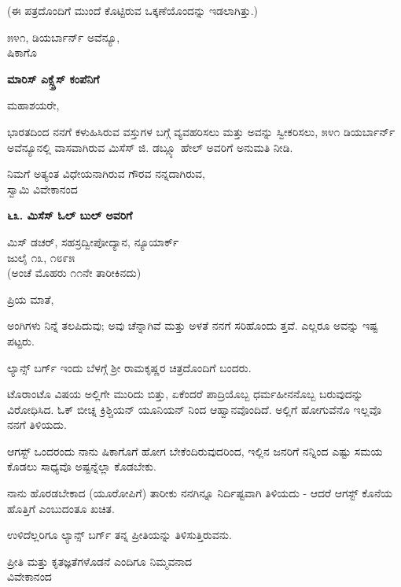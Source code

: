 (ಈ ಪತ್ರದೊಂದಿಗೆ ಮುಂದೆ ಕೊಟ್ಟಿರುವ ಒಕ್ಕಣೆಯೊಂದನ್ನು ಇಡಲಾಗಿತ್ತು.)

\begin{flushright}
೫೪೧, ಡಿಯರ್ಬಾರ್ನ್ ಅವೆನ್ಯೂ,\\ಷಿಕಾಗೊ
\end{flushright}

\begin{center}
\textbf{ಮಾರಿಸ್ ಎಕ್ಸ್ಪ್ರೆಸ್ ಕಂಪೆನಿಗೆ}
\end{center}

ಮಹಾಶಯರೇ,

ಭಾರತದಿಂದ ನನಗೆ ಕಳುಹಿಸಿರುವ ವಸ್ತುಗಳ ಬಗ್ಗೆ ವ್ಯವಹರಿಸಲು ಮತ್ತು ಅವನ್ನು ಸ್ವೀಕರಿಸಲು, ೫೪೧ ಡಿಯರ್ಬಾರ್ನ್ ಅವೆನ್ಯೂನಲ್ಲಿ ವಾಸವಾಗಿರುವ ಮಿಸೆಸ್ ಜಿ. ಡಬ್ಲ್ಯೂ ಹೇಲ್ ಅವರಿಗೆ ಅನುಮತಿ ನೀಡಿ.

\begin{flushright}
ನಿಮಗೆ ಅತ್ಯಂತ ವಿಧೇಯನಾಗಿರುವ ಗೌರವ ನನ್ನದಾಗಿರುವ,\\ಸ್ವಾಮಿ ವಿವೇಕಾನಂದ
\end{flushright}

\begin{center}
\textbf{೬೩. ಮಿಸೆಸ್ ಓಲ್ ಬುಲ್ ಅವರಿಗೆ}
\end{center}

\begin{flushright}
 ಮಿಸ್ ಡಚರ್, ಸಹಸ್ರದ್ವೀಪೋದ್ಯಾನ, ನ್ಯೂಯಾರ್ಕ್\\ಜುಲೈ ೧೩, ೧೮೯೫\\(ಅಂಚೆ ಮೊಹರು ೧೧ನೇ ತಾರೀಕಿನದು)
\end{flushright}

ಪ್ರಿಯ ಮಾತೆ,

ಅಂಗಿಗಳು ನಿನ್ನೆ ತಲಪಿದುವು; ಅವು ಚೆನ್ನಾಗಿವೆ ಮತ್ತು ಅಳತೆ ನನಗೆ ಸರಿಹೊಂದು ತ್ತವೆ. ಎಲ್ಲರೂ ಅವನ್ನು ಇಷ್ಟ ಪಟ್ಟರು.

ಲ್ಯಾನ್ಸ್ ಬರ್ಗ್ ಇಂದು ಬೆಳಗ್ಗೆ ಶ‍್ರೀ ರಾಮಕೃಷ್ಣರ ಚಿತ್ರದೊಂದಿಗೆ ಬಂದರು.

ಟೊರಾಂಟೊ ವಿಷಯ ಅಲ್ಲಿಗೇ ಮುರಿದು ಬಿತ್ತು, ಏಕೆಂದರೆ ಪಾದ್ರಿಯೊಬ್ಬ ಧರ್ಮಹೀನನೊಬ್ಬ ಬರುವುದನ್ನು ವಿರೋಧಿಸಿದ. ಓಕ್ ಬೀಚ್ನ ಕ್ರಿಶ್ಚಿಯನ್ ಯೂನಿಯನ್ ನಿಂದ ಆಹ್ವಾನವೊಂದಿದೆ. ಅಲ್ಲಿಗೆ ಹೋಗುವೆನೊ ಇಲ್ಲವೊ ನನಗೆ ತಿಳಿಯದು.

ಆಗಸ್ಟ್ ಒಂದರಂದು ನಾನು ಷಿಕಾಗೊಗೆ ಹೋಗ ಬೇಕೆಂದಿರುವುದರಿಂದ, ಇಲ್ಲಿನ ಜನರಿಗೆ ನನ್ನಿಂದ ಎಷ್ಟು ಸಮಯ ಕೊಡಲು ಸಾಧ್ಯವೊ ಅಷ್ಟನ್ನೆಲ್ಲಾ ಕೊಡಬೇಕು.

ನಾನು ಹೊರಡಬೇಕಾದ (ಯೂರೋಪಿಗೆ) ತಾರೀಕು ನನಗಿನ್ನೂ ನಿರ್ದಿಷ್ಟವಾಗಿ ತಿಳಿಯದು - ಆದರೆ ಆಗಸ್ಟ್ ಕೊನೆಯ ಹೊತ್ತಿಗೆ ಎಂಬುದಂತೂ ಖಚಿತ.

ಉಳಿದೆಲ್ಲರಿಗೂ ಲ್ಯಾನ್ಸ್ ಬರ್ಗ್ ತನ್ನ ಪ್ರೀತಿಯನ್ನು ತಿಳಿಸುತ್ತಿರುವನು.

\begin{flushright}
ಪ್ರೀತಿ ಮತ್ತು ಕೃತಜ್ಞತೆಗಳೊಡನೆ ಎಂದಿಗೂ ನಿಮ್ಮವನಾದ\\ವಿವೇಕಾನಂದ
\end{flushright}

